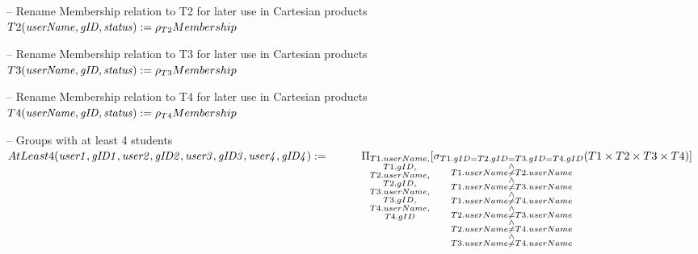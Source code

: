 \documentclass{article}
\newcommand{\var}[1]{\mathit{#1}}
\begin{document}
\begin{enumerate}
{-- Rename Membership relation to T2 for later use in Cartesian products \\[5pt]
$
T2(\var{userName, gID, status}) :=
    \rho_{T2} Membership \\[10pt]
$

-- Rename Membership relation to T3 for later use in Cartesian products \\[5pt]
$
T3(\var{userName, gID, status}) :=
    \rho_{T3} Membership \\[10pt]
$

-- Rename Membership relation to T4 for later use in Cartesian products \\[5pt]
$
T4(\var{userName, gID, status}) :=
    \rho_{T4} Membership \\[10pt]
$

-- Groups with at least 4 students \\[5pt]
$
AtLeast4(\var{user1, gID1, user2, gID2, user3, gID3, user4, gID4}) := \\[5pt]
    \hspace*{1cm}
    \Pi_{\substack{T1.userName, \\ T1.gID, \\ T2.userName, \\ T2.gID, \\ T3.userName, \\ T3.gID, \\ T4.userName, \\ T4.gID}}
	[\sigma_{
	    \substack{
	        T1.gID = T2.gID = T3.gID = T4.gID \\
	        \wedge \\
	        T1.userName \neq T2.userName \\
	        \wedge \\
	        T1.userName \neq T3.userName \\
	        \wedge \\
	        T1.userName \neq T4.userName \\
	        \wedge \\
	        T2.userName \neq T3.userName \\
	        \wedge \\
	        T2.userName \neq T4.userName \\
	        \wedge \\
	        T3.userName \neq T4.userName
	    }
	}
	(T1 \times T2 \times T3 \times T4)] \\[10pt]
$

}
\end{enumerate}
\end{document}
